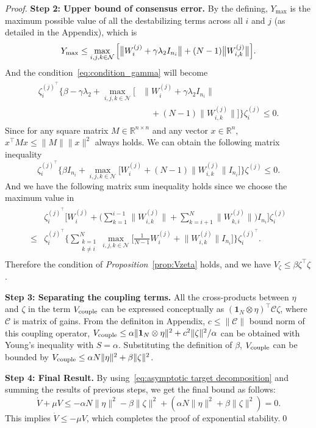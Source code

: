 \documentclass{ifacconf}
\begin{document}
\begin{proof}
\textbf{Step 2: Upper bound of consensus error.}
By the defining, $Y_{\max}$ is the maximum possible value of all the destabilizing terms across all $i$ and $j$ (as detailed in the Appendix), which is
\[Y_{\rm \max}\le \max_{i,j,k\in\mathcal{N}}\Big[\big\|W_i^{(j)}+\gamma\lambda_2 I_{n_i}\big\| + (N-1)\big\|W_{i,k}^{(j)}\big\|\Big].\]
And the condition~\eqref{eq:condition_gamma} will become
\begin{align}
    \begin{aligned}
       \zeta_i^{(j)^\top}\bigg\{\beta-\gamma\lambda_2+\max_{i,j,k\in\mathcal{N}}\Big[&\big\|W_i^{(j)}+\gamma\lambda_2 I_{n_i}\big\| \\
       &\quad+ (N-1)\big\|W_{i,k}^{(j)}\big\|\Big]\bigg\}\zeta_i^{(j)}\le0.
    \end{aligned}\nonumber
\end{align}
Since for any square matrix $M\in\mathbb{R}^{n\times n}$ and any vector $x\in\mathbb{R}^n$, $x^\top Mx\le \|M\|\|x\|^2$ always holds. We can obtain the following matrix inequality
\[\zeta_i^{(j)^\top}\bigg\{\beta I_{n_i}+\max_{i,j,k\in\mathcal{N}}\Big[W_i^{(j)} + (N-1)\big\|W_{i,k}^{(j)}\big\| I_{n_i}\Big]\bigg\}\zeta^{(j)}\le0.\]
And we have the following matrix sum inequality holds since we choose the maximum value in 
\begin{align}
    \begin{aligned}
       &\zeta^{(j)^\top}_i\bigg[W_i^{(j)}+\bigg(\sum_{k=1}^{i-1}\big\|W_{i,k}^{(j)}\big\|+\sum_{k=i+1}^{N}\big\|W_{k,i}^{(j)}\big\|\bigg) I_{n_i}\bigg]\zeta_i^{(j)}\\
       \le&\zeta_i^{(j)^\top}\Bigg\{\sum_{\substack{k=1\\k\ne i}}^{N}\max_{i,j,k\in\mathcal{N}}\Big[\frac{1}{N-1}W_i^{(j)} +\big\|W_{i,k}^{(j)}\big\| I_{n_i}\Big]\Bigg\}\zeta_i^{(j)^\top}.
    \end{aligned}\nonumber
\end{align}
Therefore the condition of {\it Proposition}~\ref{prop:Vzeta} holds, and we have $V_\zeta\le \beta\zeta^\top\zeta$.

\textbf{Step 3: Separating the coupling terms.}
All the cross-products between $\eta$ and $\zeta$ in the term $V_{\rm couple}$ can be expressed conceptually as $(\mathbf{1}_N\otimes\eta)^\top \mathcal{C} \zeta$, where $\mathcal{C}$ is matrix of gains. From the definiton in Appendix, $c\le\big\|\mathcal{C}\big\|$ bound norm of this coupling operator, $V_{\rm couple} \le \alpha  \|\mathbf{1}_N\otimes\eta\|^2 + c^2\|\zeta\|^2/\alpha$ can be obtained with Young's inequality with $S = \alpha$.
Substituting the definition of $\beta$, $V_{\rm couple}$ can be bounded by $V_{\rm couple} \le \alpha N \|\eta\|^2 + \beta \|\zeta\|^2$.

\textbf{Step 4: Final Result.}
By using~\eqref{eq:asymptotic target decomposition} and summing the results of previous steps, we get the final bound as follows:
\[\dot{V} + \mu V
         \le -\alpha N \|\eta\|^2-\beta \|\zeta\|^2 + (\alpha N \|\eta\|^2 + \beta \|\zeta\|^2)=0.\]
This implies $\dot{V} \le -\mu V$, which completes the proof of exponential stability.\qed
\end{proof}
\end{document}
